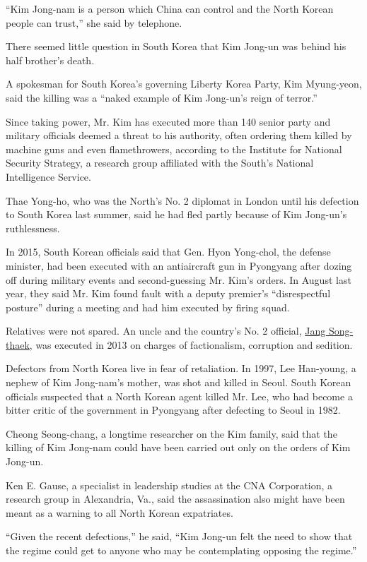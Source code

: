 ``Kim Jong-nam is a person which China can control and the North Korean
people can trust,'' she said by telephone.

There seemed little question in South Korea that Kim Jong-un was behind
his half brother's death.

A spokesman for South Korea's governing Liberty Korea Party, Kim
Myung-yeon, said the killing was a ``naked example of Kim Jong-un's
reign of terror.''

Since taking power, Mr. Kim has executed more than 140 senior party and
military officials deemed a threat to his authority, often ordering them
killed by machine guns and even flamethrowers, according to the
Institute for National Security Strategy, a research group affiliated
with the South's National Intelligence Service.

Thae Yong-ho, who was the North's No. 2 diplomat in London until his
defection to South Korea last summer, said he had fled partly because of
Kim Jong-un's ruthlessness.

In 2015, South Korean officials said that Gen. Hyon Yong-chol, the
defense minister, had been executed with an antiaircraft gun in
Pyongyang after dozing off during military events and second-guessing
Mr. Kim's orders. In August last year, they said Mr. Kim found fault
with a deputy premier's ``disrespectful posture'' during a meeting and
had him executed by firing squad.

Relatives were not spared. An uncle and the country's No. 2 official,
\href{https://www.nytimes.com/2016/03/13/world/asia/north-korea-executions-jang-song-thaek.html}{Jang
Song-thaek}, was executed in 2013 on charges of factionalism, corruption
and sedition.

Defectors from North Korea live in fear of retaliation. In 1997, Lee
Han-young, a nephew of Kim Jong-nam's mother, was shot and killed in
Seoul. South Korean officials suspected that a North Korean agent killed
Mr. Lee, who had become a bitter critic of the government in Pyongyang
after defecting to Seoul in 1982.

Cheong Seong-chang, a longtime researcher on the Kim family, said that
the killing of Kim Jong-nam could have been carried out only on the
orders of Kim Jong-un.

Ken E. Gause, a specialist in leadership studies at the CNA Corporation,
a research group in Alexandria, Va., said the assassination also might
have been meant as a warning to all North Korean expatriates.

``Given the recent defections,'' he said, ``Kim Jong-un felt the need to
show that the regime could get to anyone who may be contemplating
opposing the regime.''

